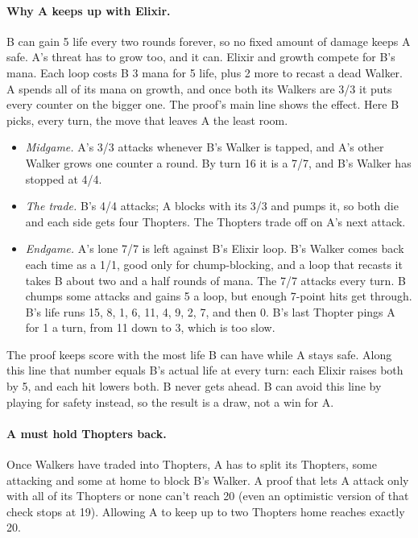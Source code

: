 \documentclass[11pt]{article}
\begin{document}
\paragraph{Why A keeps up with Elixir.} B can gain 5 life every two
rounds forever, so no fixed amount of damage keeps A safe. A's threat has
to grow too, and it can. Elixir and growth compete for B's mana. Each
loop costs B 3 mana for 5 life, plus 2 more to recast a dead Walker. A
spends all of its mana on growth, and once both its Walkers are 3/3 it
puts every counter on the bigger one. The proof's main line shows the
effect. Here B picks, every turn, the move that leaves A the least room.
\begin{itemize}
\item \emph{Midgame.} A's 3/3 attacks whenever B's Walker is tapped,
  and A's other Walker grows one counter a round. By turn 16 it is a 7/7,
  and B's Walker has stopped at 4/4.
\item \emph{The trade.} B's 4/4 attacks; A blocks with its 3/3 and
  pumps it, so both die and each side gets four Thopters. The Thopters
  trade off on A's next attack.
\item \emph{Endgame.} A's lone 7/7 is left against B's Elixir loop.
  B's Walker comes back each time as a 1/1, good only for chump-blocking,
  and a loop that recasts it takes B about two and a half rounds of mana.
  The 7/7 attacks every turn. B chumps some attacks and gains 5 a loop,
  but enough 7-point hits get through. B's life runs 15, 8, 1, 6, 11, 4,
  9, 2, 7, and then 0. B's last Thopter pings A for 1 a turn, from 11
  down to 3, which is too slow.
\end{itemize}
The proof keeps score with the most life B can have while A stays safe.
Along this line that number equals B's actual life at every turn: each
Elixir raises both by 5, and each hit lowers both. B never gets ahead.
B can avoid this line by playing for safety instead, so the result is a
draw, not a win for A.

\paragraph{A must hold Thopters back.} Once Walkers have traded into
Thopters, A has to split its Thopters, some attacking and some at home
to block B's Walker. A proof that lets A attack only with all of its
Thopters or none can't reach 20 (even an optimistic version of that check
stops at 19). Allowing A to keep up to two Thopters home reaches exactly
20.
\end{document}
